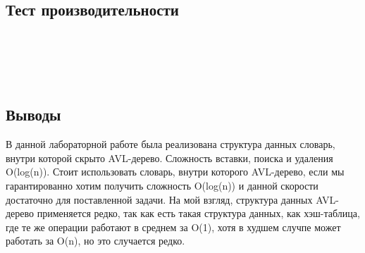 \documentclass[12pt]{article}
\begin{document}
\subsection*{Тест производительности}
 
\\ \\
\\
\subsection*{Выводы}

В данной лабораторной работе была реализована структура данных словарь, внутри которой скрыто AVL-дерево. Сложность вставки, поиска и удаления O(log(n)). Стоит использовать словарь, внутри которого AVL-дерево, если мы гарантированно хотим получить сложность O(log(n)) и данной скорости достаточно для поставленной задачи. На мой взгляд, структура данных AVL-дерево применяется редко, так как есть такая структура данных, как хэш-таблица, где те же операции работают в среднем за O(1), хотя в худшем случпе может работать за O(n), но это случается редко.
\end{document}
